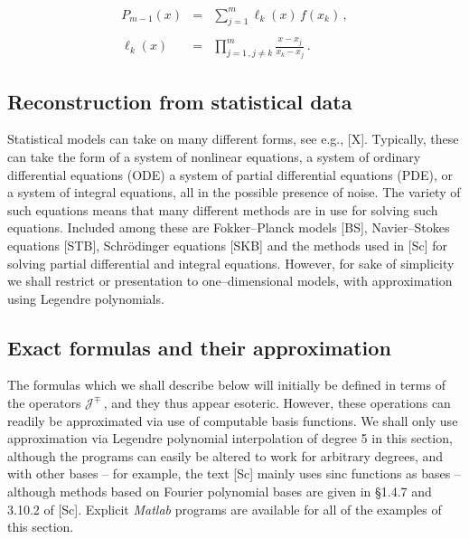 \documentclass[11pt]{article}
\begin{document}
\begin{equation}%
  \begin{array}{rcl}
    P_{m-1}(x) & = & \displaystyle \sum_{j=1}^m \ell_k(x)\,f(x_k)\,,\\
    && \\
    \ell_k(x) & = & \displaystyle \prod_{j=1\,, j \neq k}^m \frac{x - x_j}{x_k
      - x_j}\,.
    \end{array}
  \label{equation:4.3}
\end{equation}

\vspace{.2in} \noindent
\subsection{Reconstruction from statistical data}%

Statistical models can take on many different forms, see e.g., [X].
Typically, these can take the form of a system of nonlinear equations,
a system of ordinary differential equations (ODE) a system of partial
differential equations (PDE), or a system of integral equations, all
in the possible presence of noise. The variety of such equations means
that many different methods are in use for solving such equations.
Included among these are Fokker--Planck models [BS],  Navier--Stokes
equations [STB], Schr\"odinger equations [SKB] and the methods used
in [Sc] for solving partial differential and integral equations.
However, for sake of simplicity we shall restrict or presentation to
one--dimensional models, with approximation using Legendre
polynomials. 

\subsection{Exact formulas and their approximation}%

\noindent The formulas which we shall describe below will initially be
defined in terms of the operators ${\mathcal J}^\mp$\,, and they thus
appear esoteric.  However, these operations can readily be
approximated via use of computable basis functions.  We shall only use
approximation via Legendre polynomial interpolation of degree 5 in
this section, although the programs can easily be altered to work for
arbitrary degrees, and with other bases -- for example, the text [Sc]
mainly uses sinc functions as bases -- although methods based on
Fourier polynomial bases are given in \S 1.4.7 and 3.10.2 of [Sc].
Explicit {\em Matlab} programs are available for all of the examples
of this section.
\end{document}
